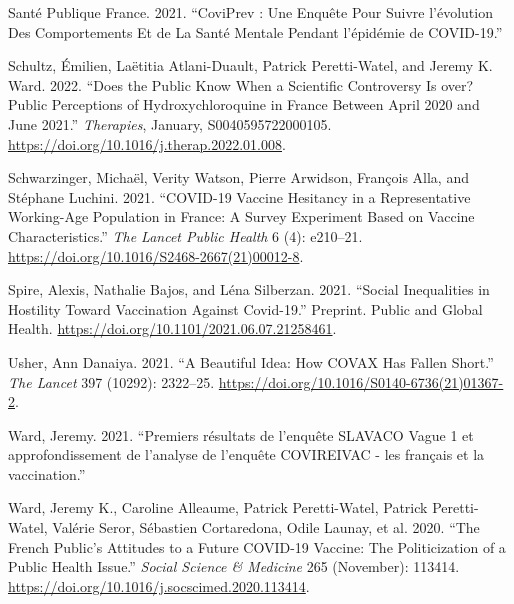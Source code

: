 \documentclass[
]{article}
\newlength{\cslhangindent}
\newlength{\cslentryspacingunit} %
\newenvironment{CSLReferences}[2] %
 {%
  \setlength{\parindent}{0pt}
  \ifodd #1
  \let\oldpar\par
  \def\par{\hangindent=\cslhangindent\oldpar}
  \fi
  \setlength{\parskip}{#2\cslentryspacingunit}
 }%
 {}
\begin{document}
\begin{CSLReferences}{1}{0}
\leavevmode{}%
Santé Publique France. 2021. {``{CoviPrev} : Une Enquête Pour Suivre
l'évolution Des Comportements Et de La Santé Mentale Pendant l'épidémie
de {COVID-19}.''}

\leavevmode{}%
Schultz, Émilien, Laëtitia Atlani-Duault, Patrick Peretti-Watel, and
Jeremy K. Ward. 2022. {``Does the Public Know When a Scientific
Controversy Is over? {Public} Perceptions of Hydroxychloroquine in
{France} Between {April} 2020 and {June} 2021.''} \emph{Therapies},
January, S0040595722000105.
\url{https://doi.org/10.1016/j.therap.2022.01.008}.

\leavevmode{}%
Schwarzinger, Michaël, Verity Watson, Pierre Arwidson, François Alla,
and Stéphane Luchini. 2021. {``{COVID-19} Vaccine Hesitancy in a
Representative Working-Age Population in {France}: A Survey Experiment
Based on Vaccine Characteristics.''} \emph{The Lancet Public Health} 6
(4): e210--21. \url{https://doi.org/10.1016/S2468-2667(21)00012-8}.

\leavevmode{}%
Spire, Alexis, Nathalie Bajos, and Léna Silberzan. 2021. {``Social
Inequalities in Hostility Toward Vaccination Against {Covid-19}.''}
Preprint. {Public and Global Health}.
\url{https://doi.org/10.1101/2021.06.07.21258461}.

\leavevmode{}%
Usher, Ann Danaiya. 2021. {``A Beautiful Idea: How {COVAX} Has Fallen
Short.''} \emph{The Lancet} 397 (10292): 2322--25.
\url{https://doi.org/10.1016/S0140-6736(21)01367-2}.

\leavevmode{}%
Ward, Jeremy. 2021. {``{Premiers résultats de l'enquête SLAVACO Vague 1
et approfondissement de l'analyse de l'enquête COVIREIVAC - les français
et la vaccination}.''}

\leavevmode{}%
Ward, Jeremy K., Caroline Alleaume, Patrick Peretti-Watel, Patrick
Peretti-Watel, Valérie Seror, Sébastien Cortaredona, Odile Launay, et
al. 2020. {``The {French} Public's Attitudes to a Future {COVID-19}
Vaccine: {The} Politicization of a Public Health Issue.''} \emph{Social
Science \& Medicine} 265 (November): 113414.
\url{https://doi.org/10.1016/j.socscimed.2020.113414}.


\end{CSLReferences}
\end{document}
